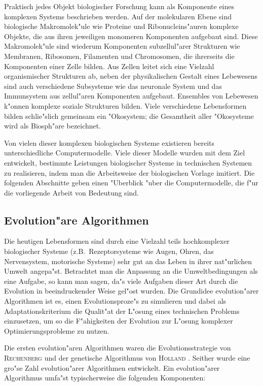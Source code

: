 Praktisch jedes Objekt biologischer Forschung kann als Komponente eines komplexen Systems beschrieben
werden. Auf der molekularen Ebene sind biologische Makromolek"ule wie Proteine und Ribonucleins"auren komplexe
Objekte, die aus ihren jeweiligen monomeren Komponenten aufgebaut sind. Diese Makromolek"ule sind wiederum Komponenten
subzellul"arer Strukturen wie Membranen, Ribosomen, Filamenten und Chromosomen, die ihrerseits die Komponenten einer
Zelle bilden. Aus Zellen leitet sich eine Vielzahl organismischer Strukturen ab, neben der physikalischen Gestalt
eines Lebewesens sind auch verschiedene Subsysteme wie das neuronale System und das Immunsystem aus zellul"aren
Komponenten aufgebaut. Ensembles von Lebewesen k"onnen komplexe soziale Strukturen bilden. Viele verschiedene
Lebensformen bilden schlie"slich gemeinsam ein "Okosystem; die Gesamtheit aller "Okosysteme wird als Biosph"are
bezeichnet.

Von vielen dieser komplexen biologischen Systeme existieren bereits unterschiedliche Computermodelle. Viele dieser
Modelle wurden mit dem Ziel entwickelt, bestimmte Leistungen biologischer Systeme in technischen Systemen zu
realisieren, indem man die Arbeitsweise der biologischen Vorlage imitiert. Die folgenden Abschnitte geben einen
"Uberblick "uber die Computermodelle, die f"ur die vorliegende Arbeit von Bedeutung sind.


\subsection{Evolution"are Algorithmen}

Die heutigen Lebensformen sind durch eine Vielzahl teils hochkomplexer biologischer Systeme (z.B.\ Rezeptorsysteme
wie Augen, Ohren, das Nervensystem, motorische Systeme) sehr gut an das Leben
in ihrer nat"urlichen Umwelt angepa"st. Betrachtet man die Anpassung an die Umweltbedingungen als eine Aufgabe,
so kann man sagen, da"s viele Aufgaben dieser Art durch die Evolution in beeindruckender Weise gel"ost wurden. 
Die Grundidee evolution"arer Algorithmen ist es, einen Evolutionsproze"s zu simulieren und dabei als Adaptationskriterium
die Qualit"at der L"osung eines technischen Problems einzusetzen, um so
die F"ahigkeiten der Evolution zur L"osung komplexer Optimierungsprobleme zu nutzen.

Die ersten evolution"aren Algorithmen waren die Evolutionsstrategie von \textsc{Rechenberg} \cite{Rechenberg} und der
genetische Algorithmus von \textsc{Holland} \cite{Goldberg89}. Seither wurde eine gro"se Zahl evolution"arer Algorithmen
entwickelt.
Ein evolution"arer Algorithmus umfa"st typischerweise die folgenden Komponenten:

